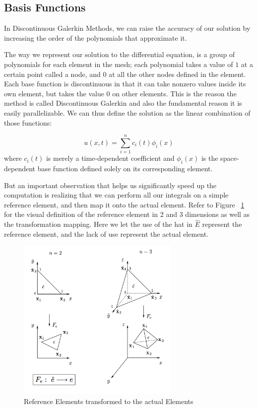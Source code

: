 \subsection{Basis Functions}

In Discontinuous Galerkin Methods, we can raise the accuracy of our solution by increasing the order of the polynomials that approximate it. 

The way we represent our solution to the differential equation, is a group of polynomials for each element in the mesh; each polynomial takes a value of $1$ at a certain point called a node, and $0$ at all the other nodes defined in the element. Each base function is discontinuous in that it can take nonzero values inside its own element, but takes the value $0$ on other elements. This is the reason the method is called Discontinuous Galerkin and also the fundamental reason it is easily parallelizable. We can thus define the solution as the linear combination of those functions:

$$u(x,t) = \sum\limits_{i=1}^n c_i(t)\phi_i(x)$$ 
where $c_i(t)$ is merely a time-dependent coefficient and $\phi_i(x)$ is the space-dependent base function defined solely on its corresponding element.


But an important observation that helps us significantly speed up the computation is realizing that we can perform all our integrals on a simple reference element, and then map it onto the actual element. Refer to Figure ~\ref{fig:Reference-Elements} for the visual definition of the reference element in 2 and 3 dimensions as well as the transformation mapping. Here we let the use of the hat in $\hat{E}$ represent the reference element, and the lack of use represent the actual element.


\begin{figure}[ht]
	\centering
	\includegraphics[width=0.7\textwidth]{Images/Reference-Elements.png}
	\caption{Reference Elements transformed to the actual Elements}
	\label{fig:Reference-Elements}
\end{figure}


